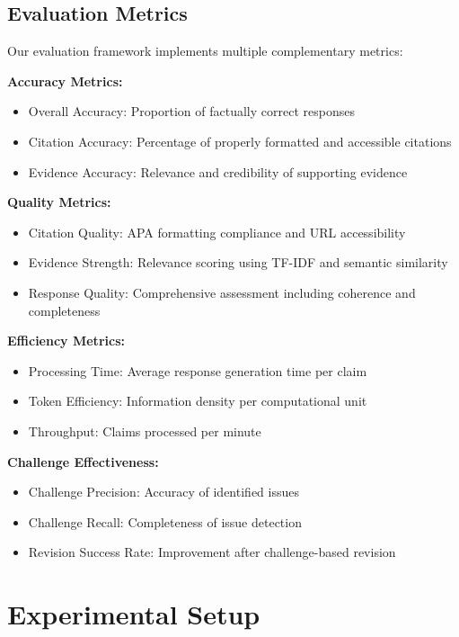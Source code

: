 \documentclass{article}
\begin{document}
\subsection{Evaluation Metrics}

Our evaluation framework implements multiple complementary metrics:

\textbf{Accuracy Metrics:}
\begin{itemize}
    \item Overall Accuracy: Proportion of factually correct responses
    \item Citation Accuracy: Percentage of properly formatted and accessible citations
    \item Evidence Accuracy: Relevance and credibility of supporting evidence
\end{itemize}

\textbf{Quality Metrics:}
\begin{itemize}
    \item Citation Quality: APA formatting compliance and URL accessibility
    \item Evidence Strength: Relevance scoring using TF-IDF and semantic similarity
    \item Response Quality: Comprehensive assessment including coherence and completeness
\end{itemize}

\textbf{Efficiency Metrics:}
\begin{itemize}
    \item Processing Time: Average response generation time per claim
    \item Token Efficiency: Information density per computational unit
    \item Throughput: Claims processed per minute
\end{itemize}

\textbf{Challenge Effectiveness:}
\begin{itemize}
    \item Challenge Precision: Accuracy of identified issues
    \item Challenge Recall: Completeness of issue detection
    \item Revision Success Rate: Improvement after challenge-based revision
\end{itemize}

\section{Experimental Setup}
\end{document}
